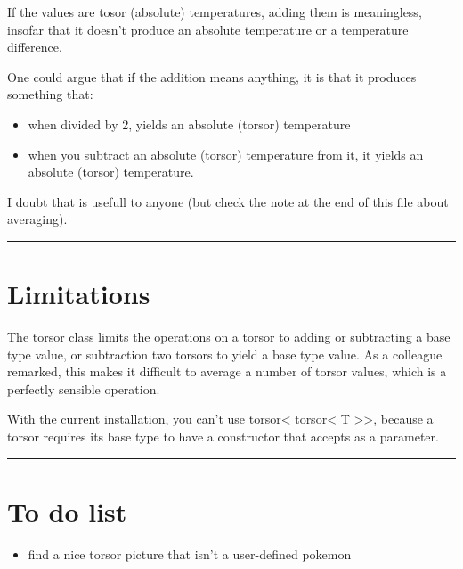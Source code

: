 \documentclass[]{article}
\providecommand{\tightlist}{%
  \setlength{\itemsep}{0pt}\setlength{\parskip}{0pt}}
\begin{document}
If the values are tosor (absolute) temperatures, adding them is
meaningless, insofar that it doesn't produce an absolute temperature or
a temperature difference.

One could argue that if the addition means anything, it is that it
produces something that:

\begin{itemize}
\item
  when divided by 2, yields an absolute (torsor) temperature
\item
  when you subtract an absolute (torsor) temperature from it, it yields
  an absolute (torsor) temperature.
\end{itemize}

I doubt that is usefull to anyone (but check the note at the end of this
file about averaging).

\begin{center}\rule{0.5\linewidth}{\linethickness}\end{center}

\hypertarget{limitations}{%
\section{Limitations}\label{limitations}}

The torsor class limits the operations on a torsor to adding or
subtracting a base type value, or subtraction two torsors to yield a
base type value. As a colleague remarked, this makes it difficult to
average a number of torsor values, which is a perfectly sensible
operation.

With the current installation, you can't use torsor\textless{}
torsor\textless{} T \textgreater{}\textgreater{}, because a torsor
requires its base type to have a constructor that accepts as a
parameter.

\begin{center}\rule{0.5\linewidth}{\linethickness}\end{center}

\hypertarget{to-do-list}{%
\section{To do list}\label{to-do-list}}

\begin{itemize}
\tightlist
\item
  find a nice torsor picture that isn't a user-defined pokemon
\end{itemize}
\end{document}
